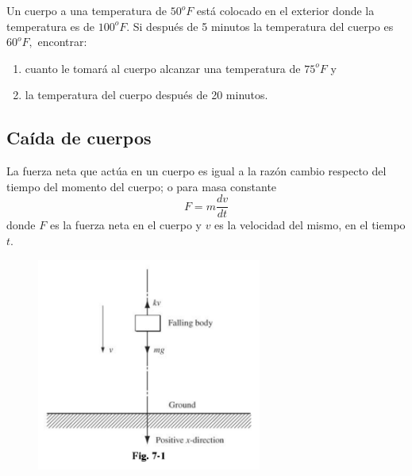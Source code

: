 % 
%
%
% 
{}
	\begin{problema}
		Un cuerpo a una temperatura de $50^{o}F$ está colocado en el exterior donde la temperatura es de $100^{o}F.$ Si después de 5 minutos la temperatura del cuerpo es $60^{o}F,$ encontrar:
		\begin{enumerate}
			\item cuanto le tomará al cuerpo alcanzar una temperatura de $75^{o}F$ y
			\item la temperatura del cuerpo después de 20 minutos.
		\end{enumerate}
		
	\end{problema}
	

\subsection{Caída de cuerpos}


	\begin{rem}
		La fuerza neta que actúa en un cuerpo es igual a la razón cambio respecto del tiempo del momento del cuerpo; o para masa constante
		\begin{equation}
			\label{bron:7.3}
			F=m\dfrac{dv}{dt}
		\end{equation}
		donde $F$ es la fuerza neta en el cuerpo y $v$ es la velocidad del mismo, en el tiempo $t.$
	\end{rem}
	




	\begin{figure}
		\centering
		\includegraphics[height=7cm,keepaspectratio=true]{./edo/img020501.png}
		\label{fig:020501}
	\end{figure}
	



